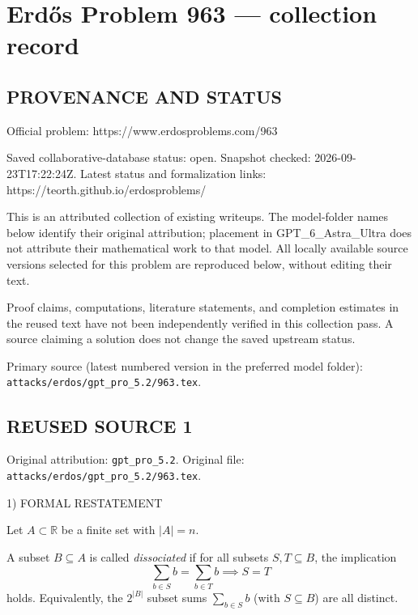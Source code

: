 \section*{Erd\H{o}s Problem 963 --- collection record}

\subsection*{PROVENANCE AND STATUS}
Official problem: https://www.erdosproblems.com/963

Saved collaborative-database status: open.
Snapshot checked: 2026-09-23T17:22:24Z.
Latest status and formalization links: https://teorth.github.io/erdosproblems/

This is an attributed collection of existing writeups. The model-folder names below identify their original attribution; placement in GPT\_6\_Astra\_Ultra does not attribute their mathematical work to that model. All locally available source versions selected for this problem are reproduced below, without editing their text.

Proof claims, computations, literature statements, and completion estimates in the reused text have not been independently verified in this collection pass. A source claiming a solution does not change the saved upstream status.

Primary source (latest numbered version in the preferred model folder): \texttt{attacks/erdos/gpt\_pro\_5.2/963.tex}.

\subsection*{REUSED SOURCE 1}
Original attribution: \texttt{gpt\_pro\_5.2}.
Original file: \texttt{attacks/erdos/gpt\_pro\_5.2/963.tex}.


1) FORMAL RESTATEMENT

Let $A\subset\mathbb R$ be a finite set with $|A|=n$.

A subset $B\subseteq A$ is called \emph{dissociated} if for all subsets $S,T\subseteq B$, the implication
\[
\sum_{b\in S} b = \sum_{b\in T} b \implies S=T
\]
holds. Equivalently, the $2^{|B|}$ subset sums $\sum_{b\in S} b$ (with $S\subseteq B$) are all distinct.

